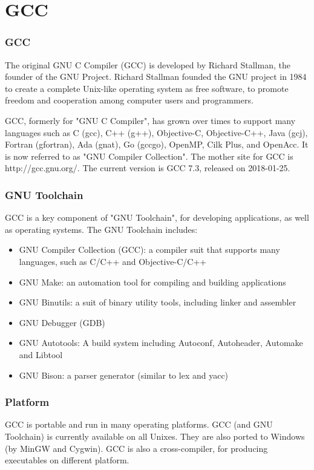 \documentclass{beamer}
\begin{document}
\section{GCC}
\begin{frame}
\frametitle{GCC}
The original GNU C Compiler (GCC) is developed by Richard Stallman, the founder of the GNU Project. Richard Stallman founded the GNU project in 1984 to create a complete Unix-like operating system as free software, to promote freedom and cooperation among computer users and programmers.

GCC, formerly for "GNU C Compiler", has grown over times to support many languages such as C (gcc), C++ (g++), Objective-C, Objective-C++, Java (gcj), Fortran (gfortran), Ada (gnat), Go (gccgo), OpenMP, Cilk Plus, and OpenAcc. It is now referred to as "GNU Compiler Collection". The mother site for GCC is http://gcc.gnu.org/. The current version is GCC 7.3, released on 2018-01-25.
\end{frame}
\begin{frame}
\frametitle{GNU Toolchain}
GCC is a key component of "GNU Toolchain", for developing applications, as well as operating systems. The GNU Toolchain includes:
\begin{itemize}
\item GNU Compiler Collection (GCC): a compiler suit that supports many languages, such as C/C++ and Objective-C/C++
\item GNU Make: an automation tool for compiling and building applications
\item GNU Binutils: a suit of binary utility tools, including linker and assembler
\item GNU Debugger (GDB)
\item GNU Autotools: A build system including Autoconf, Autoheader, Automake and Libtool
\item GNU Bison: a parser generator (similar to lex and yacc)
\end{itemize}
\end{frame}
\begin{frame}
\frametitle{Platform}
GCC is portable and run in many operating platforms. GCC (and GNU Toolchain) is currently available on all Unixes. They are also ported to Windows (by MinGW and Cygwin). GCC is also a cross-compiler, for producing executables on different platform.
\end{frame}
\end{document}
